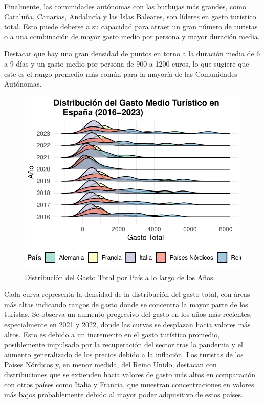 \documentclass[data,article,submit,moreauthors,pdftex]{Definitions/mdpi}
\begin{document}
Finalmente, las comunidades autónomas con las burbujas más grandes, como
Cataluña, Canarias, Andalucía y las Islas Baleares, son líderes en gasto
turístico total. Esto puede deberse a su capacidad para atraer un gran
número de turistas o a una combinación de mayor gasto medio por persona
y mayor duración media.

Destacar que hay una gran densidad de puntos en torno a la duración
media de 6 a 9 días y un gasto medio por persona de 900 a 1200 euros, lo
que sugiere que este es el rango promedio más común para la mayoría de
las Comunidades Autónomas.

\begin{figure}[H]
\includegraphics{ProyectoAED2024_Rmd_files/figure-latex/unnamed-chunk-25-1} \caption{Distribución del Gasto Total por País a lo largo de los Años.\label{fig:ridgelineplot}}\label{fig:unnamed-chunk-25}
\end{figure}

Cada curva representa la densidad de la distribución del gasto total,
con áreas más altas indicando rangos de gasto donde se concentra la
mayor parte de los turistas. Se observa un aumento progresivo del gasto
en los años más recientes, especialmente en 2021 y 2022, donde las
curvas se desplazan hacia valores más altos. Esto es debido a un
incremento en el gasto turístico promedio, posiblemente impulsado por la
recuperación del sector tras la pandemia y el aumento generalizado de
los precios debido a la inflación. Los turistas de los Países Nórdicos
y, en menor medida, del Reino Unido, destacan con distribuciones que se
extienden hacia valores de gasto más altos en comparación con otros
países como Italia y Francia, que muestran concentraciones en valores
más bajos probablemente debido al mayor poder adquisitivo de estos
países.
\end{document}

